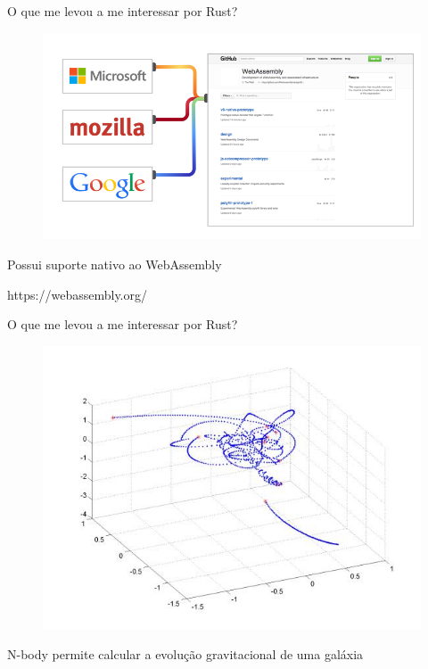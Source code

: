 \begin{frame}[fragile]{O que me levou a me interessar por Rust?}
\begin{figure}[ht!]
  \centering
  \includegraphics[scale=0.4]{images/webassembly.png}
\end{figure}
\begin{center}
\small{Possui suporte nativo ao WebAssembly}
\end{center}
\begin{center}
\small{https://webassembly.org/}
\end{center}
\end{frame}

\begin{frame}[fragile]{O que me levou a me interessar por Rust?}
\begin{figure}[ht!]
  \centering
  \includegraphics[scale=0.6]{images/n-body.jpg}
\end{figure}
\begin{center}
\small{N-body permite calcular a evolução gravitacional de uma galáxia}
\end{center}
\end{frame}

